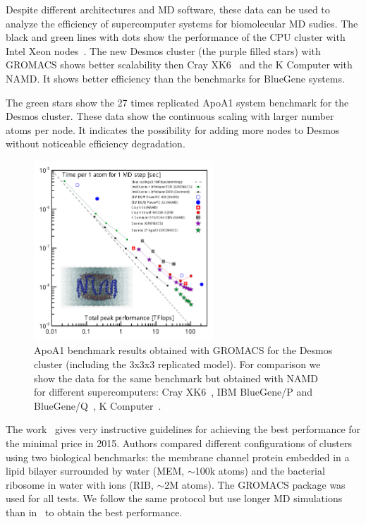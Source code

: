 \documentclass{llncs}
\begin{document}
Despite different architectures and MD software, these data can be used to analyze the efficiency of supercomputer systems for biomolecular MD sudies. The black and green lines with dots show the performance of the CPU cluster with Intel Xeon nodes~\cite{StegailovSmirnov-MatModCompSim2016}. The new Desmos cluster (the purple filled stars) with GROMACS shows better scalability then Cray XK6~\cite{NAMD-CrayXK6-2012} and the K Computer with NAMD. It shows better efficiency than the benchmarks for BlueGene systems\cite{NAMD-BlueGene-2013}. 

The green stars show the 27 times replicated ApoA1 system benchmark for the Desmos cluster. These data show the continuous scaling with larger number atoms per node. It indicates the possibility for adding more nodes to Desmos without noticeable efficiency degradation.

\begin{figure}
\centering
\includegraphics[width=0.6\textwidth]{img/compar_comp.pdf}
\caption{\label{ApoA1} ApoA1 benchmark results obtained with GROMACS for the Desmos cluster (including the 3x3x3 replicated model). For comparison we show the data for the same benchmark but obtained with NAMD for different supercomputers: Cray XK6~\cite{NAMD-CrayXK6-2012}, IBM BlueGene/P and BlueGene/Q~\cite{NAMD-BlueGene-2013}, K Computer~\cite{NAMD-KComputer}.}
\end{figure}

The work~\cite{Kutzner2015} gives very instructive guidelines for achieving the best performance for the minimal price in 2015. Authors compared different configurations of clusters using two biological benchmarks: the membrane channel protein embedded in a lipid bilayer surrounded by water (MEM, $\sim $100k atoms) and the bacterial ribosome in water with ions (RIB, $\sim$2M atoms). The GROMACS package was used for all tests. We follow the same protocol but use longer MD simulations than in~\cite{Kutzner2015} to obtain the best performance.
\end{document}
